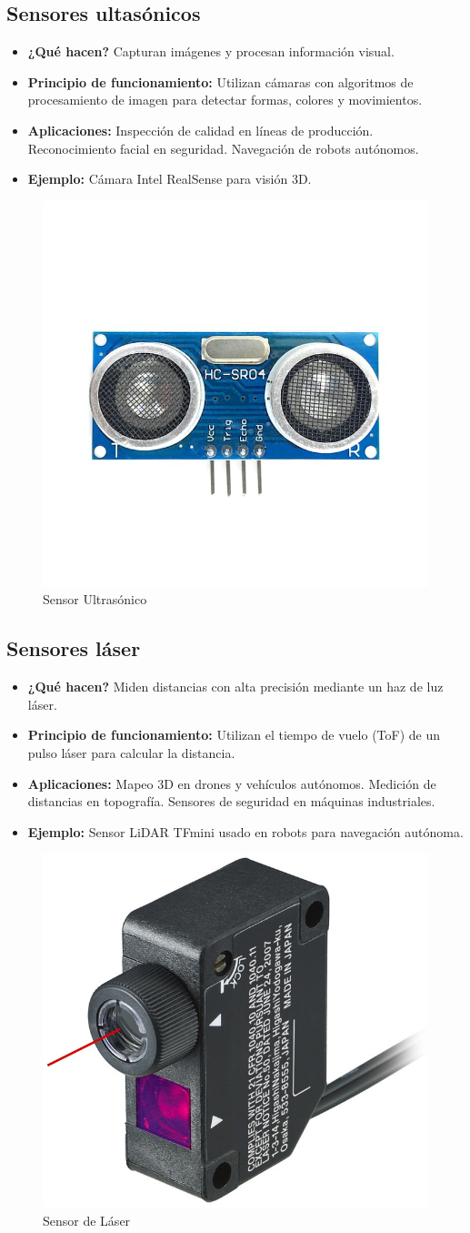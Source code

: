 \subsection*{Sensores ultasónicos}
\begin{itemize}
	\item \textbf{¿Qué hacen?} Capturan imágenes y procesan información visual.
	\item \textbf{Principio de funcionamiento:} Utilizan cámaras con algoritmos de procesamiento de imagen para detectar formas, colores y movimientos.
	\item \textbf{Aplicaciones:} Inspección de calidad en líneas de producción.
	Reconocimiento facial en seguridad.
	Navegación de robots autónomos.
	\item \textbf{Ejemplo:} Cámara Intel RealSense para visión 3D.
	\cite{makeblock_sensores_2025}
\end{itemize}
\begin{figure}[h]
	\centering
	\includegraphics[width=0.3\linewidth]{img/sensor ultrasonico}
	\caption{Sensor Ultrasónico}
	\label{fig:sensor ultrasonico}
\end{figure}

\subsection*{Sensores láser}
\begin{itemize}
	\item \textbf{¿Qué hacen?} Miden distancias con alta precisión mediante un haz de luz láser.
	\item \textbf{Principio de funcionamiento:} Utilizan el tiempo de vuelo (ToF) de un pulso láser para calcular la distancia.
	\item \textbf{Aplicaciones:} Mapeo 3D en drones y vehículos autónomos.
	Medición de distancias en topografía.
	Sensores de seguridad en máquinas industriales.
	\item \textbf{Ejemplo:} Sensor LiDAR TFmini usado en robots para navegación autónoma.
\end{itemize}
\begin{figure}[h]
	\centering
	\includegraphics[width=0.3\linewidth]{img/sensor laser}
	\caption{Sensor de Láser}
	\label{fig:sensor laser}
\end{figure}

